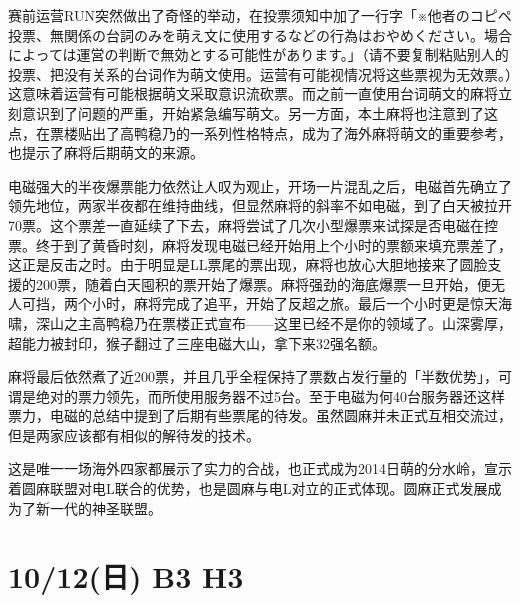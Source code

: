赛前运营RUN突然做出了奇怪的举动，在投票须知中加了一行字「{\mincho ※他者のコピペ投票、無関係の台詞のみを萌え文に使用するなどの行為はおやめください。場合によっては運営の判断で無効とする可能性があります。}」（请不要复制粘贴别人的投票、把没有关系的台词作为萌文使用。运营有可能视情况将这些票视为无效票。）这意味着运营有可能根据萌文采取意识流砍票。而之前一直使用台词萌文的麻将立刻意识到了问题的严重，开始紧急编写萌文。另一方面，本土麻将也注意到了这点，在票楼贴出了高鸭稳乃的一系列性格特点，成为了海外麻将萌文的重要参考，也提示了麻将后期萌文的来源。

电磁强大的半夜爆票能力依然让人叹为观止，开场一片混乱之后，电磁首先确立了领先地位，两家半夜都在维持曲线，但显然麻将的斜率不如电磁，到了白天被拉开70票。这个票差一直延续了下去，麻将尝试了几次小型爆票来试探是否电磁在控票。终于到了黄昏时刻，麻将发现电磁已经开始用上个小时的票额来填充票差了，这正是反击之时。由于明显是LL票尾的票出现，麻将也放心大胆地接来了圆脸支援的200票，随着白天囤积的票开始了爆票。麻将强劲的海底爆票一旦开始，便无人可挡，两个小时，麻将完成了追平，开始了反超之旅。最后一个小时更是惊天海啸，深山之主高鸭稳乃在票楼正式宣布——这里已经不是你的领域了。山深雾厚，超能力被封印，猴子翻过了三座电磁大山，拿下来32强名额。

麻将最后依然煮了近200票，并且几乎全程保持了票数占发行量的「半数优势」，可谓是绝对的票力领先，而所使用服务器不过5台。至于电磁为何40台服务器还这样票力，电磁的总结中提到了后期有些票尾的待发。虽然圆麻并未正式互相交流过，但是两家应该都有相似的解待发的技术。

这是唯一一场海外四家都展示了实力的合战，也正式成为2014日萌的分水岭，宣示着圆麻联盟对电L联合的优势，也是圆麻与电L对立的正式体现。圆麻正式发展成为了新一代的神圣联盟。

\section{10/12(日) B3 H3}


